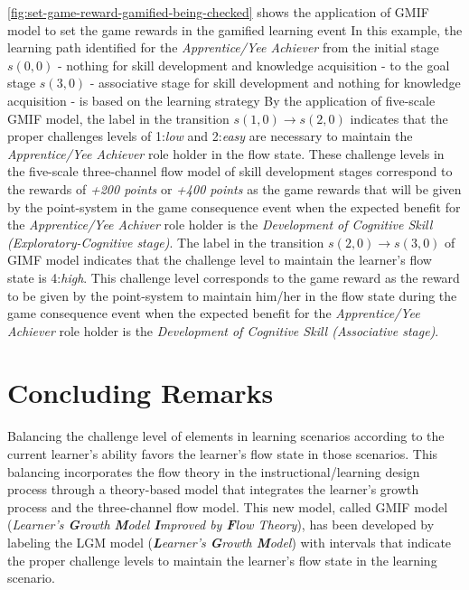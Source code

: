 \autoref{fig:set-game-reward-gamified-being-checked} shows the application of GMIF model to set the game rewards in the gamified learning event 
In this example, the learning path identified for the \emph{Apprentice/Yee Achiever} from the initial stage $s(0,0)$ - nothing for skill development and knowledge acquisition -  to the goal stage $s(3,0)$ - associative stage for skill development and nothing for knowledge acquisition - is based on the learning strategy 
By the application of five-scale GMIF model, the label 
\aspas{$[1;2]$} in the transition $s(1,0) \to s(2,0)$ indicates that the proper challenges levels of 1:\emph{low} and 2:\emph{easy} are necessary to maintain the \emph{Apprentice/Yee Achiever} role holder in the flow state.
These challenge levels in the five-scale three-channel flow model of skill development stages correspond to the rewards of \emph{+200 points} or \emph{+400 points} as the game rewards that will be given by the point-system in the game consequence event when the expected benefit for the \emph{Apprentice/Yee Achiver} role holder is the \emph{Development of Cognitive Skill (Exploratory-Cognitive stage)}.
The label \aspas{$[3;3]$} in the transition $s(2,0) \to s(3,0)$ of GIMF model indicates that the challenge level to maintain the learner's flow state is 4:\emph{high}.
This challenge level corresponds to the game reward  as the reward to be given by the point-system to maintain him/her in the flow state during the game consequence event when the expected benefit for the \emph{Apprentice/Yee Achiever} role holder is the \emph{Development of Cognitive Skill (Associative stage)}.

\section{Concluding Remarks}
\label{sec:model-gmif-concluding-remarks} 

Balancing the challenge level of elements in learning scenarios according to the current learner's ability favors the learner's flow state in those scenarios.
This balancing incorporates the flow theory in the instructional/learning design process through a theory-based model that integrates the learner's growth process and the three-channel flow model.
This new model, called GMIF model (\emph{Learner's \textbf{G}rowth \textbf{M}odel \textbf{I}mproved by \textbf{F}low Theory}), has been developed by labeling the LGM model (\emph{\textbf{L}earner's \textbf{G}rowth \textbf{M}odel}) with intervals that indicate the proper challenge levels to maintain the learner's flow state in the learning scenario.

